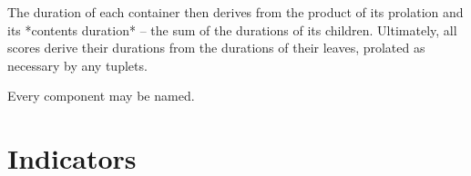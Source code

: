 The duration of each container then derives from the product of its prolation
and its *contents duration* -- the sum of the durations of its children.
Ultimately, all scores derive their durations from the durations of their
leaves, prolated as necessary by any tuplets.

Every component may be named.

\begin{comment}
-   components, leaves, containers (and contexts)
-   components are formattable and illustrable
-   components are mutable, while indicators are generally not
    -   likewise, durations and pitches are immutable

-   count-time components
    -   note, chord, rest, skip, container, tuplet, measure
-   non-count-time (contexts)
    -   voice, staff, staff group, score

-   leaves do not contain anything else
    -   chord do *not* contain notes
    -   chords and notes contain note heads
    -   chord and notes share a single stem
    -   this must be disambiguated from note columns

-   all containers derive their duration from their contents (with some
    exceptions, but even there a mismatch is an error)
-   written duration, prolated duration, pre-prolated duration, contents
    duration

-   One, and only one, parent per component. They *cannot* be in more than one
    container. This is both confusing, and liable to cause reference problems.
-   score hierarchy is not fixed: any node is the root, if it has no parent

-   contexts are assumed to last from the beginning to the end of the total
    timespan of the score, but in practice they may be intermittent
-   contexts may be named, allowing concatenation

-   Leaves reside at the "bottom" of the score hierarchy.

Work aspects of this into appropriate sections

-   inspect_()
-   not *inspect()*, as that would cause a name conflict with Python's inspect
    module
-   inspect(...).get_parentage()
-   inspect_(...).get_duration()
    -   in_seconds=True
-   inspect_(...).get_timespan()
    -   in_seconds=True
\end{comment}

\section{Indicators}

